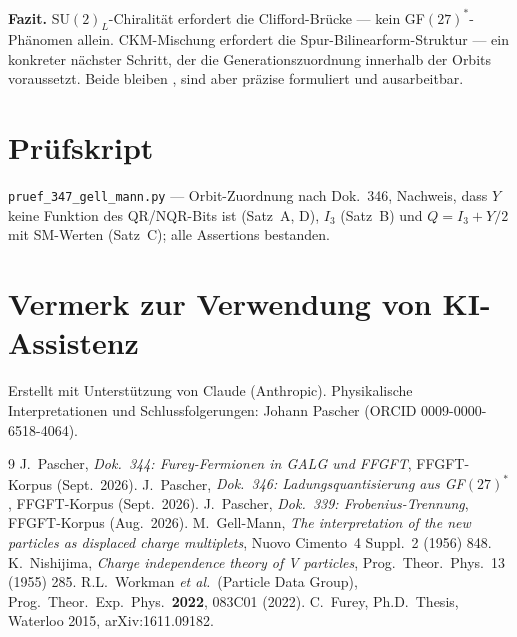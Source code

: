 \textbf{Fazit.} SU$(2)_L$-Chiralität erfordert die Clifford-Brücke ---
kein GF$(27)^*$-Phänomen allein. CKM-Mischung erfordert die
Spur-Bilinearform-Struktur --- ein konkreter nächster Schritt, der
die Generationszuordnung innerhalb der Orbits voraussetzt.
Beide bleiben \SM, sind aber präzise formuliert und ausarbeitbar.

\section*{Prüfskript}
\texttt{pruef\_347\_gell\_mann.py} --- Orbit-Zuordnung nach Dok.~346, Nachweis, dass $Y$ keine Funktion des QR/NQR-Bits ist (Satz~A, D), $I_3$ (Satz~B) und $Q=I_3+Y/2$ mit SM-Werten (Satz~C); alle Assertions bestanden.

\section*{Vermerk zur Verwendung von KI-Assistenz}
Erstellt mit Unterstützung von Claude (Anthropic).
Physikalische Interpretationen und Schlussfolgerungen:
Johann Pascher (ORCID 0009-0000-6518-4064).

\begin{thebibliography}{9}
 J.~Pascher, \textit{Dok.~344: Furey-Fermionen in GALG und FFGFT}, FFGFT-Korpus (Sept.\ 2026).
 J.~Pascher, \textit{Dok.~346: Ladungsquantisierung aus GF$(27)^*$}, FFGFT-Korpus (Sept.\ 2026).
 J.~Pascher, \textit{Dok.~339: Frobenius-Trennung}, FFGFT-Korpus (Aug.\ 2026).
 M.~Gell-Mann, \textit{The interpretation of the new particles as displaced charge multiplets}, Nuovo Cimento~4 Suppl.~2 (1956) 848.
 K.~Nishijima, \textit{Charge independence theory of V particles}, Prog.\ Theor.\ Phys.\ 13 (1955) 285.
 R.L.~Workman \emph{et al.}\ (Particle Data Group),
Prog.\ Theor.\ Exp.\ Phys.\ \textbf{2022}, 083C01 (2022).
 C.~Furey, Ph.D.\ Thesis, Waterloo 2015, arXiv:1611.09182.
\end{thebibliography}
